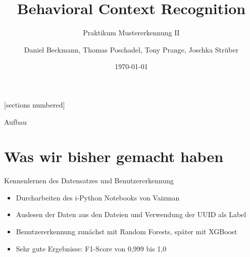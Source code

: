 \documentclass[10pt,%
	wide,%
	xcolor={x11names},%
	hyperref={colorlinks},%
	pantone312,%
	handout,%
	]{beamer}
\author{Daniel Beckmann, Thomas Poschadel, Tony Prange, Joschka Strüber}
\title{Behavioral Context Recognition}
\subtitle{Praktikum Mustererkennung II}
\date{\today}
\begin{document}
[sections numbered]

\begin{frame}[plain]
  \maketitle
\end{frame}

\begin{frame}[t]{Aufbau}
\end{frame}

\section{Was wir bisher gemacht haben}

\begin{frame}[t]{Kennenlernen des Datensatzes und Benutzererkennung}
	\begin{itemize}
		\item Durcharbeiten des i-Python Notebooks von Vaizman
		\item Auslesen der Daten aus den Dateien und Verwendung der UUID als Label
		\item Benutzererkennung zunächst mit Random Forests, später mit XGBoost
		\item Sehr gute Ergebnisse: F1-Score von 0,999 bis 1,0 
	\end{itemize}
\end{frame}
\end{document}

